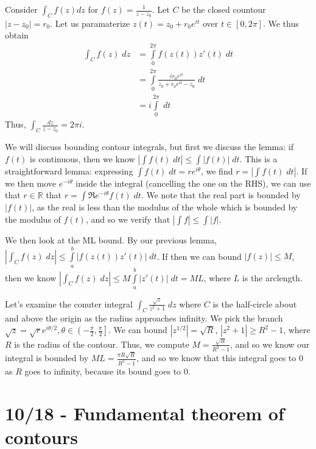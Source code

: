 \documentclass[10pt]{report}
\newcommand{\abs}[1]{\left|#1\right|}
\begin{document}
Consider $\int_C f(z) dz$ for $f(z) = \frac{1}{z-z_0}$. Let $C$ be the closed countour $|z-z_0| = r_0$. Let us paramaterize $z(t) = z_0 + r_0e^{it}$ over $t \in [0,2\pi]$. We thus obtain
\begin{align*}
	\int_C f(z)\; dz &= \displaystyle\int\limits_{0}^{2\pi}f(z(t)) z'(t)\;dt\\
	&= \displaystyle\int\limits_{0}^{2\pi}\frac{ir_0 e^{it}}{z_0 + r_0e^{it}-z_0}\;dt\\
	&= i\displaystyle\int\limits_{0}^{2\pi}\;dt
\end{align*}
Thus, $\int_C \frac{dz}{z-z_0} = 2\pi i$.

We will discuss bounding contour integrals, but first we discuss the lemma: if $f(t)$ is continuous, then we know $\abs{\int f(t)\; dt} \leq \int \abs{f(t)} \; dt$. This is a straightforward lemma: expressing $\int f(t) \; dt = re^{i\theta}$, we find $r = \abs{\int f(t)\; dt}$. If we then move $e^{-i\theta}$ inside the integral (cancelling the one on the RHS), we can use that $r \in \mathbb{R}$ that $r = \int \Re e^{-i\theta}f(t)\; dt$. We note that the real part is bounded by $\abs{f(t)}$, as the real is less than the modulus of the whole which is bounded by the modulus of $f(t)$, and so we verify that $\abs{\int f} \leq \int\abs{f}$. 

We then look at the ML bound. By our previous lemma, $\abs{\int_C f(z)\; dz} \leq \displaystyle\int\limits_{a}^{b}\abs{f(z(t))z'(t)}\;dt$. If then we can bound $\abs{f(z)} \leq M$, then we know $\abs{\int_C f(z) \; dz} \leq M \displaystyle\int\limits_{a}^{b}\abs{z'(t)}\;dt = ML$, where $L$ is the arclength.

Let's examine the conuter integral $\int_C \frac{\sqrt{z}}{z^2 + 1}\; dz$ where $C$ is the half-circle about and above the origin as the radius approaches infinity. We pick the branch $\sqrt{z} = \sqrt{r} e^{i\theta/2}, \theta \in \left( -\frac{\pi}{2},\frac{\pi}{2} \right]$. We can bound $\abs{z^{1/2}} = \sqrt{R}$, $|z^2+1| \geq R^2 - 1$, where $R$ is the radius of the contour. Thus, we compute $M = \frac{\sqrt{R}}{R^2 - 1}$, and so we know our integral is bounded by $ML = \frac{\pi R \sqrt{R}}{R^2 - 1}$, and so we know that this integral goes to $0$ as $R$ goes to infinity, because its bound goes to $0$. 

\chapter{10/18 - Fundamental theorem of contours}
\end{document}
